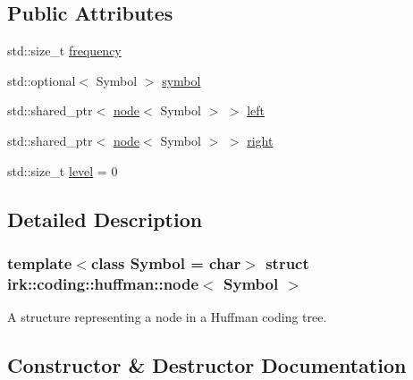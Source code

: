 \subsection*{Public Attributes}
\begin{DoxyCompactItemize}
\item 
std\+::size\+\_\+t \mbox{\hyperlink{structirk_1_1coding_1_1huffman_1_1node_ae303f67bca534f5fcbf2a64a586cd7a9}{frequency}}
\item 
std\+::optional$<$ Symbol $>$ \mbox{\hyperlink{structirk_1_1coding_1_1huffman_1_1node_a5506528b3c23fa2187b767a90ca3bfcc}{symbol}}
\item 
std\+::shared\+\_\+ptr$<$ \mbox{\hyperlink{structirk_1_1coding_1_1huffman_1_1node}{node}}$<$ Symbol $>$ $>$ \mbox{\hyperlink{structirk_1_1coding_1_1huffman_1_1node_ac4303bd6570125c1d18506a8596f3b8f}{left}}
\item 
std\+::shared\+\_\+ptr$<$ \mbox{\hyperlink{structirk_1_1coding_1_1huffman_1_1node}{node}}$<$ Symbol $>$ $>$ \mbox{\hyperlink{structirk_1_1coding_1_1huffman_1_1node_addc238c8601bb721a25a5750f6c33ebd}{right}}
\item 
std\+::size\+\_\+t \mbox{\hyperlink{structirk_1_1coding_1_1huffman_1_1node_ae34639865753731eb74aaae1244442e7}{level}} = 0
\end{DoxyCompactItemize}


\subsection{Detailed Description}
\subsubsection*{template$<$class Symbol = char$>$\newline
struct irk\+::coding\+::huffman\+::node$<$ Symbol $>$}

A structure representing a node in a Huffman coding tree. 

\subsection{Constructor \& Destructor Documentation}
\mbox{\label{structirk_1_1coding_1_1huffman_1_1node_ac43d799be382afcd794720a9c3294f4d}} 
